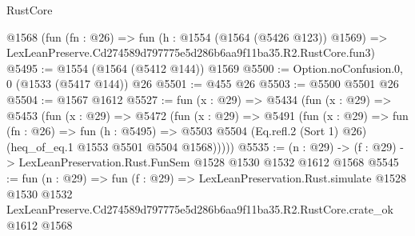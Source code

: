 \begin{lexlean}{RustCore}
\begin{coremodule}
    @1568
    (fun (fn : @26) =>
    fun (h : @1554 (@1564 (@5426 @123)) @1569) =>
    LexLeanPreserve.Cd274589d797775e5d286b6aa9f11ba35.R2.RustCore.fun3)
@5495 := @1554 (@1564 (@5412 @144)) @1569
@5500 := Option.noConfusion.{0, 0} (@1533 (@5417 @144)) @26
@5501 := @455 @26
@5503 := @5500 @5501 @26
@5504 := @1567 @1612
@5527 := fun (x : @29) =>
  @5434
    (fun (x : @29) =>
    @5453
      (fun (x : @29) =>
      @5472
        (fun (x : @29) =>
        @5491
          (fun (x : @29) =>
          fun (fn : @26) =>
          fun (h : @5495) =>
          @5503 @5504 (Eq.refl.{2} (Sort 1) @26) (heq_of_eq.{1} @1553 @5501 @5504 @1568)))))
@5535 := (n : @29) -> (f : @29) -> LexLeanPreservation.Rust.FunSem @1528 @1530 @1532 @1612 @1568
@5545 := fun (n : @29) =>
  fun (f : @29) =>
  LexLeanPreservation.Rust.simulate
    @1528
    @1530
    @1532
    LexLeanPreserve.Cd274589d797775e5d286b6aa9f11ba35.R2.RustCore.crate_ok
    @1612
    @1568
\end{coremodule}
\end{lexlean}
